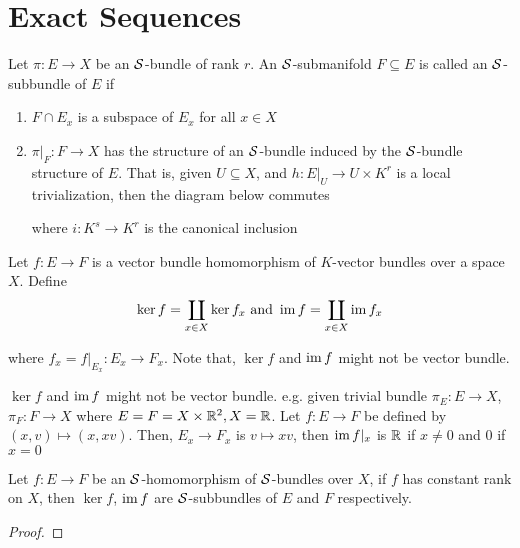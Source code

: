 \section{Exact Sequences}

\begin{definition}[subbundle]
	Let $\pi: E \to X$ be an $\mathcal{S}$-bundle of rank $r$. An $\mathcal{S}$-submanifold $F \subseteq E$ is called an $\mathcal{S}$-subbundle of $E$ if
	\begin{enumerate}
		\item $F \cap E_x$ is a subspace of $E_x$ for all $x \in X$
		\item $\pi\vert_F: F \to X$ has the structure of an $\mathcal{S}$-bundle induced by the $\mathcal{S}$-bundle structure of $E$. That is, given $U \subseteq X$, and $h: E\vert_U \to U \times K^r$ is a local trivialization, then the diagram below commutes
		\begin{center}
		\end{center}
		
		where $i: K^s \to K^r$ is the canonical inclusion
	\end{enumerate}
\end{definition}

\begin{definition}
	Let $f: E \to F$ is a vector bundle homomorphism of $K$-vector bundles over a space $X$. Define
	$$
	\ker f = \coprod_{x \in X} \ker f_x \text{ and } \operatorname{im} f = \coprod_{x \in X} \operatorname{im} f_x
	$$
	
	where $f_x = f\vert_{E_x}: E_x \to F_x$. Note that, $\ker f$ and $\operatorname{im} f$ might not be vector bundle.
\end{definition}

\begin{remark}
	$\ker f$ and $\operatorname{im} f$ might not be vector bundle. e.g. given trivial bundle $\pi_E: E \to X$, $\pi_F: F \to X$ where $E = F = X \times \mathbb{R}^2, X = \mathbb{R}$. Let $f: E \to F$ be defined by $(x, v) \mapsto (x, xv)$. Then, $E_x \to F_x$ is $v \mapsto xv$, then $\operatorname{im} f|_x$ is $\mathbb{R}$ if $x \neq 0$ and $0$ if $x = 0$
\end{remark}

\begin{proposition}
	Let $f: E \to F$ be an $\mathcal{S}$-homomorphism of $\mathcal{S}$-bundles over $X$, if $f$ has constant rank on $X$, then $\ker f$, $\operatorname{im} f$ are $\mathcal{S}$-subbundles of $E$ and $F$ respectively.
	\begin{proof}
	\end{proof}
\end{proposition}

